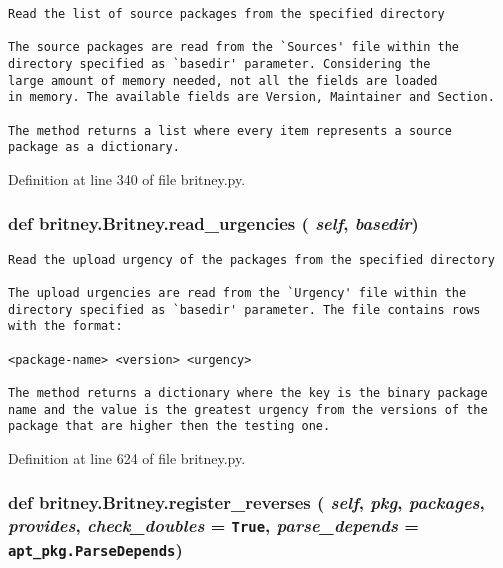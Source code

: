 \footnotesize\begin{verbatim}Read the list of source packages from the specified directory

The source packages are read from the `Sources' file within the
directory specified as `basedir' parameter. Considering the
large amount of memory needed, not all the fields are loaded
in memory. The available fields are Version, Maintainer and Section.

The method returns a list where every item represents a source
package as a dictionary.
\end{verbatim}
\normalsize
 

Definition at line 340 of file britney.py.
\subsubsection{\setlength{\rightskip}{0pt plus 5cm}def britney.Britney.read\_\-urgencies ( {\em self},  {\em basedir})}\label{classbritney_1_1Britney_09fc27899506b4830b1961f125a7b6a4}




\footnotesize\begin{verbatim}Read the upload urgency of the packages from the specified directory

The upload urgencies are read from the `Urgency' file within the
directory specified as `basedir' parameter. The file contains rows
with the format:

<package-name> <version> <urgency>

The method returns a dictionary where the key is the binary package
name and the value is the greatest urgency from the versions of the
package that are higher then the testing one.
\end{verbatim}
\normalsize
 

Definition at line 624 of file britney.py.
\subsubsection{\setlength{\rightskip}{0pt plus 5cm}def britney.Britney.register\_\-reverses ( {\em self},  {\em pkg},  {\em packages},  {\em provides},  {\em check\_\-doubles} = {\tt True},  {\em parse\_\-depends} = {\tt apt\_\-pkg.ParseDepends})}\label{classbritney_1_1Britney_f86b93b64ac43c1d04fe88a6a8b1777e}




